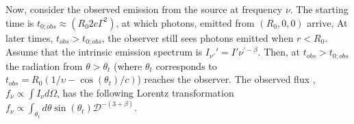 Now, consider the observed emission from the source at frequency $\nu$. 
The starting time is $t_{0;obs}\approx(R_0 2 c \Gamma^2)$,  
at which photons, emitted from $(R_0, 0, 0)$ arrive, At later times, 
$t_{obs}>t_{0;obs}$, the observer still sees photons emitted when $r < R_0$. 
%
Assume that the intrinsic emission spectrum is $I_{\nu'}' = I'\nu^{'-\beta}$.
Then, at $t_{obs} > t_{0;obs}$ the radiation from $\theta > \theta_t$ 
(where $\theta_t$ corresponds to $t_{obs} = R_0 (1/\upsilon - \cos(\theta_t)/c)$) 
reaches the observer.
%
The observed flux \eg, $f_{\nu} \propto \int I_{\nu} d\Omega$, has the following 
Lorentz transformation 
$f_{\nu}\propto\int_{\theta_t} d\theta \sin(\theta_t) \mathcal{D}^{-(3+\beta)}$.
%
%
